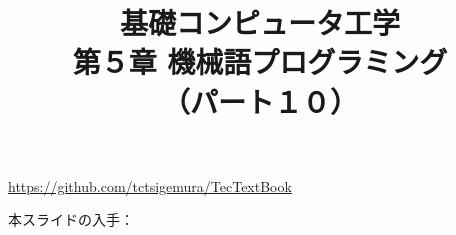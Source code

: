 \documentclass[handout]{beamer}        %
\begin{document}
\title{基礎コンピュータ工学\\第５章 機械語プログラミング\\（パート１０）}
\date{}

\begin{frame}
  \titlepage
  \centerline{\url{https://github.com/tctsigemura/TecTextBook}}
  \vfill
  \centerline{本スライドの入手：
    }
\end{frame}

\end{document}
